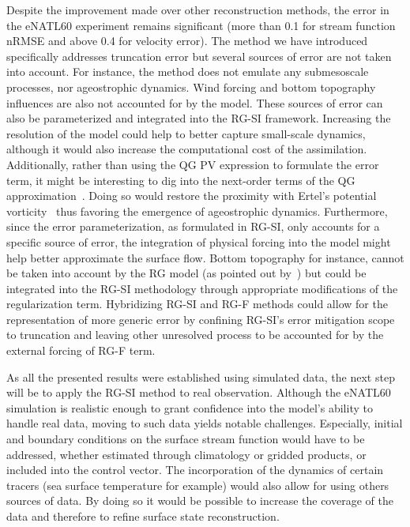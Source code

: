 \documentclass[
  draft
]{agujournal2025}
\begin{document}
Despite the improvement made over other reconstruction methods, the error in the eNATL60 experiment remains significant (more than 0.1 for stream function nRMSE and above 0.4 for velocity error). The method we have introduced specifically addresses truncation error but several sources of error are not taken into account. 
For instance, the method does not emulate any submesoscale processes, nor ageostrophic dynamics. Wind forcing and bottom topography influences are also not accounted for by the model. These sources of error can also be parameterized and integrated into the RG-SI framework. 
Increasing the resolution of the model could help to better capture small-scale dynamics, although it would also increase the computational cost of the assimilation.
Additionally, rather than using the QG PV expression to formulate the error term, it might be interesting to dig into the next-order terms of the QG approximation~\cite{muraki1999}. Doing so would restore the proximity with Ertel's potential vorticity~\cite{muller1995} thus favoring the emergence of ageostrophic dynamics. 
Furthermore, since the error parameterization, as formulated in RG-SI, only accounts for a specific source of error, the integration of physical forcing into the model might help better approximate the surface flow. Bottom topography for instance, cannot be taken into account by the RG model (as pointed out by~) but could be integrated into the RG-SI methodology through appropriate modifications of the regularization term.
Hybridizing RG-SI and RG-F methods could allow for the representation of more generic error by confining RG-SI's error mitigation scope to truncation and leaving other unresolved process to be accounted for by the external forcing of RG-F term.

As all the presented results were established using simulated data, the next step will be to apply the RG-SI method to real observation. Although the eNATL60 simulation is realistic enough to grant confidence into the model's ability to handle real data, moving to such data yields notable challenges. Especially, initial and boundary conditions on the surface stream function would have to be addressed, whether estimated through climatology or gridded products, or included into the control vector. The incorporation of the dynamics of certain tracers (sea surface temperature for example) would also allow for using others sources of data. By doing so it would be possible to increase the coverage of the data and therefore to refine surface state reconstruction.
\end{document}
